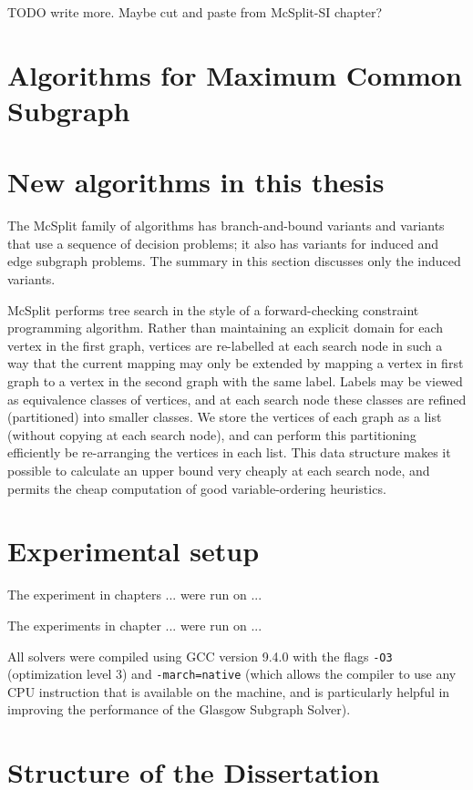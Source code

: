 TODO write more. Maybe cut and paste from McSplit-SI chapter?

\section{Algorithms for Maximum Common Subgraph} 

\section{New algorithms in this thesis}

The McSplit family of algorithms has branch-and-bound variants and variants
that use a sequence of decision problems; it also has variants for induced and
edge subgraph problems. The summary in this section discusses only the induced
variants.

McSplit performs tree search in the style of a forward-checking constraint
programming algorithm. Rather than maintaining an explicit domain for each
vertex in the first graph, vertices are re-labelled at each search node in such
a way that the current mapping may only be extended by mapping a vertex in
first graph to a vertex in the second graph with the same label. Labels may be
viewed as equivalence classes of vertices, and at each search node these
classes are refined (partitioned) into smaller classes. We store the vertices
of each graph as a list (without copying at each search node), and can perform
this partitioning efficiently be re-arranging the vertices in each list. This
data structure makes it possible to calculate an upper bound very cheaply at
each search node, and permits the cheap computation of good variable-ordering
heuristics.

\section{Experimental setup}

The experiment in chapters ... were run on ...

The experiments in chapter ... were run on ...

All solvers were compiled using GCC version 9.4.0 with the flags
\texttt{-O3} (optimization level 3) and \texttt{-march=native}
(which allows the compiler to use any CPU instruction that is available
on the machine, and is particularly helpful in improving the performance
of the Glasgow Subgraph Solver).

\section{Structure of the Dissertation}

